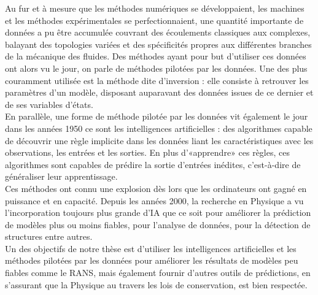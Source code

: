 \documentclass[a4paper,12pt]{article}
\newcommand{\cad}{c'est-à-dire}
\numberwithin{equation}{section} %
\begin{document}
\noindent Au fur et à mesure que les méthodes numériques se développaient, les machines et les méthodes expérimentales se perfectionnaient, une quantité importante de données a pu être accumulée couvrant des écoulements classiques aux complexes, balayant des topologies variées et des spécificités propres aux différentes branches de la mécanique des fluides. Des méthodes ayant pour but d'utiliser ces données ont alors vu le jour, on parle de méthodes pilotées par les données. Une des plus couramment utilisée est la méthode dite d'inversion : elle consiste à retrouver les paramètres d'un modèle, disposant auparavant des données issues de ce dernier et de ses variables d'états. \\

\noindent En parallèle, une forme de méthode pilotée par les données vit également le jour dans les années 1950 ce sont les intelligences artificielles : des algorithmes capable de découvrir une règle implicite dans les données liant les caractéristiques avec les observations, les entrées et les sorties. En plus d'«apprendre» ces règles, ces algorithmes sont capables de prédire la sortie d'entrées inédites, \cad $ $ de généraliser leur apprentissage. \\
Ces méthodes ont connu une explosion dès lors que les ordinateurs ont gagné en puissance et en capacité. Depuis les années 2000, la recherche en Physique a vu l'incorporation toujours plus grande d'IA que ce soit pour améliorer la prédiction de modèles plus ou moins fiables, pour l'analyse de données, pour la détection de structures entre autres. \\

\noindent Un des objectifs de notre thèse est d'utiliser les intelligences artificielles et les méthodes pilotées par les données pour améliorer les résultats de modèles peu fiables comme le RANS, mais également fournir d'autres outils de prédictions, en s'assurant que la Physique au travers les lois de conservation, est bien respectée.

\end{document}
